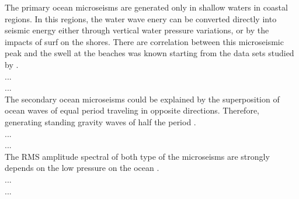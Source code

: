 The primary ocean microseisms are generated only in shallow waters in coastal regions. In this regions, the water wave enery can be converted directly into seismic energy either through vertical water pressure variations, or by the impacts of surf on the shores. There are correlation between this microseismic peak and the swell at the beaches was known starting from the data sets studied by \cite{haubrich1963comparative}.
\\
...\\
...\\

The secondary ocean microseisms could be explained by the superposition of ocean waves of equal period traveling in opposite directions. Therefore, generating standing gravity waves of half the period \cite{longuet1950theory}. 
\\
...\\
...\\

The RMS amplitude spectral of both type of the microseisms are strongly depends on the low pressure on the ocean \cite{naticchioni2014microseismic}.
\\
...\\
...\\

